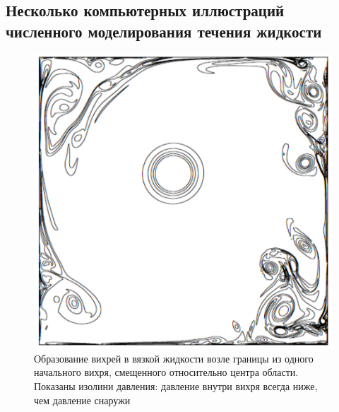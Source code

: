 


\subsection{Несколько компьютерных иллюстраций численного моделирования течения жидкости}
\begin{figure}[htp]
\centering
\includegraphics[width=0.5\linewidth]{historyImg/vortex_small.pdf}
\caption{Образование вихрей в вязкой жидкости возле границы из одного начального вихря, смещенного относительно центра области. Показаны изолини давления:  давление внутри вихря всегда ниже, чем давление снаружи}
\end{figure}

